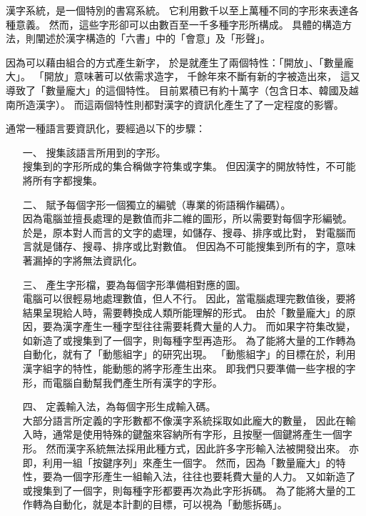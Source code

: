 ﻿
漢字系統，是一個特別的書寫系統。%
它利用數千以至上萬種不同的字形來表達各種意義。%
然而，這些字形卻可以由數百至一千多種字形所構成。
具體的構造方法，則闡述於漢字構造的「六書」中的「會意」及「形聲」。

因為可以藉由組合的方式產生新字，%
於是就產生了兩個特性：「開放」、「數量龐大」。%
「開放」意味著可以依需求造字，%
千餘年來不斷有新的字被造出來，%
這又導致了「數量龐大」的這個特性。%
目前累積已有約十萬字（包含日本、韓國及越南所造漢字）。%
而這兩個特性則都對漢字的資訊化產生了了一定程度的影響。

通常一種語言要資訊化，要經過以下的步驟：
\begin{enumerate}
\item[一、]搜集該語言所用到的字形。\\
搜集到的字形所成的集合稱做字符集或字集。%
但因漢字的開放特性，不可能將所有字都搜集。

\item[二、]賦予每個字形一個獨立的編號（專業的術語稱作編碼）。\\
因為電腦並擅長處理的是數值而非二維的圖形，所以需要對每個字形編號。%
於是，原本對人而言的文字的處理，如儲存、搜尋、排序或比對，%
對電腦而言就是儲存、搜尋、排序或比對數值。%
但因為不可能搜集到所有的字，意味著漏掉的字將無法資訊化。

\item[三、]產生字形檔，要為每個字形準備相對應的圖。\\
電腦可以很輕易地處理數值，但人不行。%
因此，當電腦處理完數值後，要將結果呈現給人時，需要轉換成人類所能理解的形式。%
由於「數量龐大」的原因，要為漢字產生一種字型往往需要耗費大量的人力。%
而如果字符集改變，如新造了或搜集到了一個字，則每種字型再造形。%
為了能將大量的工作轉為自動化，就有了「動態組字」的研究出現。%
「動態組字」的目標在於，利用漢字組字的特性，能動態的將字形產生出來。%
即我們只要準備一些字根的字形，而電腦自動幫我們產生所有漢字的字形。

\item[四、]定義輸入法，為每個字形生成輸入碼。\\
大部分語言所定義的字形數都不像漢字系統採取如此龐大的數量，%
因此在輸入時，通常是使用特殊的鍵盤來容納所有字形，且按壓一個鍵將產生一個字形。
然而漢字系統無法採用此種方式，因此許多字形輸入法被開發出來。%
亦即，利用一組「按鍵序列」來產生一個字。%
然而，因為「數量龐大」的特性，要為一個字形產生一組輸入法，往往也要耗費大量的人力。%
又如新造了或搜集到了一個字，則每種字形都要再次為此字形拆碼。%
為了能將大量的工作轉為自動化，就是本計劃的目標，可以視為「動態拆碼」。

\end{enumerate}

